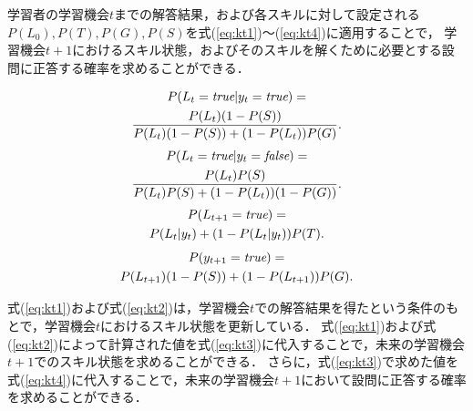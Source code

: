学習者の学習機会$t$までの解答結果，および各スキルに対して設定される$P(L_{0}),  P(T),  P(G),  P(S)$を式(\ref{eq:kt1})〜(\ref{eq:kt4})に適用することで，
学習機会$t+1$におけるスキル状態，およびそのスキルを解くために必要とする設問に正答する確率を求めることができる．

\vspace{-7mm}
\begin{multline}
  P(L_{t}=\emph{true}|y_{t}=\emph{true})  = \\
  \frac{P(L_{t})(1-P(S))}{P(L_{t})(1-P(S)) + (1-P(L_{t}))P(G)}.  \label{eq:kt1}
\end{multline}
\vspace{-8mm}
\begin{multline}
  P(L_{t}=\emph{true}|y_{t}=\emph{false})  = \\
  \frac{P(L_{t})P(S)}{P(L_{t})P(S) + (1-P(L_{t}))(1-P(G))}. \label{eq:kt2}
\end{multline}
\vspace{-8mm}
\begin{multline}
  P(L_{t+1}=\emph{true})  = \\
  P(L_{t}|y_{t}) + (1-P(L_{t}|y_{t}))P(T). \label{eq:kt3}
\end{multline}
\vspace{-11mm}
\begin{multline}
  P(y_{t+1}=\emph{true})  = \\
  P(L_{t+1})(1-P(S)) + (1-P(L_{t+1}))P(G). \label{eq:kt4}
\end{multline}

式(\ref{eq:kt1})および式(\ref{eq:kt2})は，学習機会$t$での解答結果を得たという条件のもとで，学習機会$t$におけるスキル状態を更新している．
式(\ref{eq:kt1})および式(\ref{eq:kt2})によって計算された値を式(\ref{eq:kt3})に代入することで，未来の学習機会$t+1$でのスキル状態を求めることができる．
さらに，式(\ref{eq:kt3})で求めた値を式(\ref{eq:kt4})に代入することで，未来の学習機会$t+1$において設問に正答する確率を求めることができる．
